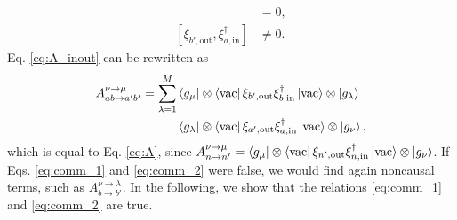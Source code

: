 \documentclass[aps,pra,reprint,amsmath,amssymb]{revtex4-1}
\begin{document}
\begin{align}
[\xi_{a',\text{out}},\xi_{b,\text{in}}^\dagger]&=0, \label{eq:comm_1} \\
[\xi_{b',\text{out}},\xi_{a,\text{in}}^\dagger]&\neq 0. \label{eq:comm_2}
\end{align}
Eq. \eqref{eq:A_inout} can be rewritten as
\begin{align}
A_{ab\to a'b'}^{\nu\to\mu}=\sum_{\lambda=1}^M&\bra{g_\mu}\otimes\bra{\text{vac}}\xi_{b',\text{out}}\xi_{b,\text{in}}^\dagger \ket{\text{vac}}\otimes\ket{g_\lambda}\nonumber\\
&\bra{g_\lambda} \otimes \bra{\text{vac}} \xi_{a',\text{out}} \xi_{a,\text{in}}^\dagger
\ket{\text{vac}}\otimes\ket{g_\nu},
\end{align}
which is equal to Eq. \eqref{eq:A}, since $A_{n\to n'}^{\nu\to\mu}=\bra{g_\mu}\otimes\bra{\text{vac}}\xi_{n',\text{out}}\xi_{n,\text{in}}^\dagger \ket{\text{vac}}\otimes\ket{g_\nu}$. If Eqs. \eqref{eq:comm_1} and \eqref{eq:comm_2} were false, we would find again noncausal terms, such as $A_{b\to b'}^{\nu\to\lambda}$. In the following, we show that the relations \eqref{eq:comm_1} and \eqref{eq:comm_2} are true.
\end{document}
